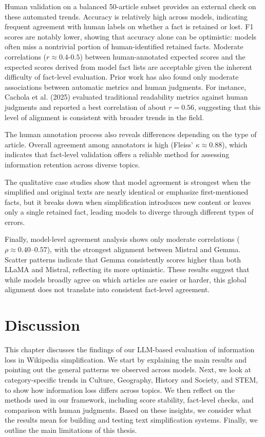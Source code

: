 \documentclass{DESSThesis}
\begin{document}
Human validation on a balanced 50-article subset provides an external check on these automated trends. Accuracy is relatively high across models, indicating frequent agreement with human labels on whether a fact is retained or lost. F1 scores are notably lower, showing that accuracy alone can be optimistic: models often miss a nontrivial portion of human-identified retained facts. Moderate correlations ($r \approx 0.4$-$0.5$) between human-annotated expected scores and the expected scores derived from model fact lists are acceptable given the inherent difficulty of fact-level evaluation. Prior work has also found only moderate associations between automatic metrics and human judgments. For instance, Cachola et al. (2025)\cite{cachola2025evaluating} evaluated traditional readability metrics against human judgments and reported a best correlation of about $r = 0.56$, suggesting that this level of alignment is consistent with broader trends in the field.

The human annotation process also reveals differences depending on the type of article. Overall agreement among annotators is high (Fleiss’ $\kappa \approx 0.88$), which indicates that fact-level validation offers a reliable method for assessing information retention across diverse topics.

The qualitative case studies show that model agreement is strongest when the simplified and original texts are nearly identical or emphasize first-mentioned facts, but it breaks down when simplification introduces new content or leaves only a single retained fact, leading models to diverge through different types of errors.

Finally, model-level agreement analysis shows only moderate correlations ($\rho \approx 0.40$–$0.57$), with the strongest alignment between Mistral and Gemma. Scatter patterns indicate that Gemma consistently scores higher than both LLaMA and Mistral, reflecting its more optimistic. These results suggest that while models broadly agree on which articles are easier or harder, this global alignment does not translate into consistent fact-level agreement.

\chapter{Discussion}
This chapter discusses the findings of our LLM-based evaluation of information loss in Wikipedia simplification. We start by explaining the main results and pointing out the general patterns we observed across models. Next, we look at category-specific trends in Culture, Geography, History and Society, and STEM, to show how information loss differs across topics. We then reflect on the methods used in our framework, including score stability, fact-level checks, and comparison with human judgments. Based on these insights, we consider what the results mean for building and testing text simplification systems. Finally, we outline the main limitations of this thesis.
\end{document}
